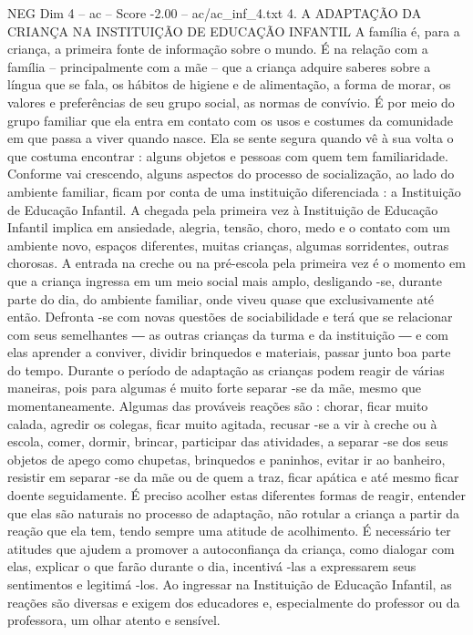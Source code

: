 \begin{textsample}{NEG Dim 4 – ac – Score -2.00 – ac/ac\_inf\_4.txt}  \label{ex:f4_neg_044}
4.
A ADAPTAÇÃO DA CRIANÇA NA INSTITUIÇÃO DE EDUCAÇÃO INFANTIL A família é, para a criança, a primeira fonte de informação sobre o mundo.
É na relação com a família – principalmente com a mãe – que a criança adquire saberes sobre a língua que se fala, os hábitos de higiene e de alimentação, a forma de morar, os valores e preferências de seu grupo social, as normas de convívio.
É por meio do grupo familiar que ela entra em contato com os usos e costumes da comunidade em que passa a viver quando nasce.
Ela se sente segura quando vê à sua volta o que costuma encontrar : alguns objetos e pessoas com quem tem familiaridade.
Conforme vai crescendo, alguns aspectos do processo de socialização, ao lado do ambiente familiar, ficam por conta de uma instituição diferenciada : a Instituição de Educação Infantil.
A chegada pela primeira vez à Instituição de Educação Infantil implica em ansiedade, alegria, tensão, choro, medo e o contato com um ambiente novo, espaços diferentes, muitas crianças, algumas sorridentes, outras chorosas.
A entrada na creche ou na pré-escola pela primeira vez é o momento em que a criança ingressa em um meio social mais amplo, desligando -se, durante parte do dia, do ambiente familiar, onde viveu quase que exclusivamente até então.
Defronta -se com novas questões de sociabilidade e terá que se relacionar com seus semelhantes ― as outras crianças da turma e da instituição ― e com elas aprender a conviver, dividir brinquedos e materiais, passar junto boa parte do tempo.
Durante o período de adaptação as crianças podem reagir de várias maneiras, pois para algumas é muito forte separar -se da mãe, mesmo que momentaneamente.
Algumas das prováveis reações são : chorar, ficar muito calada, agredir os colegas, ficar muito agitada, recusar -se a vir à creche ou à escola, comer, dormir, brincar, participar das atividades, a separar -se dos seus objetos de apego como chupetas, brinquedos e paninhos, evitar ir ao banheiro, resistir em separar -se da mãe ou de quem a traz, ficar apática e até mesmo ficar doente seguidamente.
É preciso acolher estas diferentes formas de reagir, entender que elas são naturais no processo de adaptação, não rotular a criança a partir da reação que ela tem, tendo sempre uma atitude de acolhimento.
É necessário ter atitudes que ajudem a promover a autoconfiança da criança, como dialogar com elas, explicar o que farão durante o dia, incentivá -las a expressarem seus sentimentos e legitimá -los.
Ao ingressar na Instituição de Educação Infantil, as reações são diversas e exigem dos educadores e, especialmente do professor ou da professora, um olhar atento e sensível.

\end{textsample}
